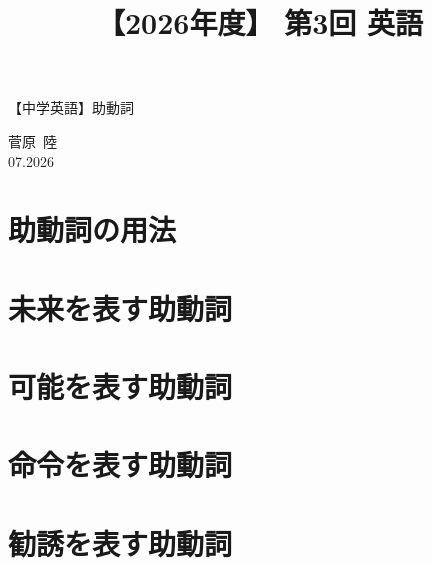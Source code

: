 \documentclass[12pt,a4paper]{jsarticle}
\title{【2026年度】 第3回 英語}                %
\author{}                     %
\date{}                       %
\begin{document}
\begin{center}
{\LARGE 【中学英語】助動詞}
\end{center}

\vspace{5mm}
\begin{flushright}
  菅原\ 陸\\[1.2em]
  07.2026
\end{flushright}


\section{助動詞の用法}



\section{未来を表す助動詞}



\section{可能を表す助動詞}



\section{命令を表す助動詞}



\section{勧誘を表す助動詞}


\end{document}
